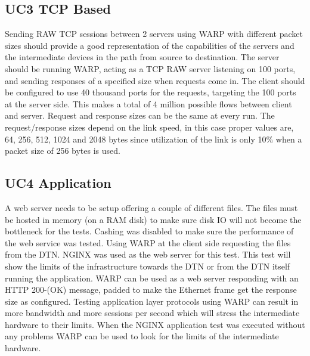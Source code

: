 \subsection{UC3 TCP Based}
Sending RAW TCP sessions between 2 servers using WARP with different packet sizes should provide a good representation of the capabilities of the servers and the intermediate devices in the path from source to destination. 
The server should be running WARP, acting as a TCP RAW server listening on 100 ports, and sending responses of a specified size when requests come in. The client should be configured to use 40 thousand ports for the requests, targeting the 100 ports at the server side. This makes a total of 4 million possible flows between client and server. Request and response sizes can be the same at every run. The request/response sizes depend on the link speed, in this case proper values are, 64, 256, 512, 1024 and 2048 bytes since utilization of the link is only 10\% when a packet size of 256 bytes is used.  

\subsection{UC4 Application}

A web server needs to be setup offering a couple of different files. The files must be hosted in memory (on a RAM disk) to make sure disk IO will not become the bottleneck for the tests. Cashing was disabled to make sure the performance of the web service was tested. Using WARP at the client side requesting the files from the DTN. NGINX\cite{nginx} was used as the web server for this test. This test will show the limits of the infrastructure towards the DTN or from the DTN itself running the application. WARP can be used as a web server responding with an HTTP 200-(OK) message, padded to make the Ethernet frame get the response size as configured. Testing application layer protocols using WARP can result in more bandwidth and more sessions per second which will stress the intermediate hardware to their limits. When the NGINX application test was executed without any problems WARP can be used to look for the limits of the intermediate hardware.

